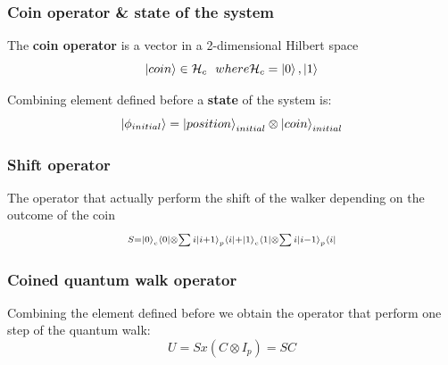 \documentclass{beamer}
\begin{document}
\begin{frame}
    \frametitle{Coin operator \& state of the system}
    The \textbf{coin operator} is a vector in a 2-dimensional Hilbert space 
    \begin{equation}
        \ket{coin} \in \mathcal{H}_{c} \,\,\,\, where \mathcal{H}_{c} = \ket{0}, \ket{1}
    \end{equation}
    
    Combining element defined before a \textbf{state} of the system is:
    \begin{equation}
        \ket{\phi_{initial}} = \ket{position}_{initial} \otimes \ket{coin}_{initial}
    \end{equation}
\end{frame}

\begin{frame}
    \frametitle{Shift operator}
    The operator that actually perform the shift of the walker depending on the outcome of the coin
    \begin{equation}
        \scriptstyle S = \ket{0}_{c} \bra{0} \otimes \sum{i} \ket{i + 1}_{p} \bra{i} + \ket{1}_{c} \bra{1} \otimes \sum{i} \ket{i - 1}_{p} \bra{i} 
    \end{equation}
\end{frame}

\begin{frame}
    \frametitle{Coined quantum walk operator}
    Combining the element defined before we obtain the operator that perform one step of the 
    quantum walk:
    \begin{equation}
        U = S x (C \otimes I_{p}) = SC
    \end{equation}
\end{frame}
\end{document}
